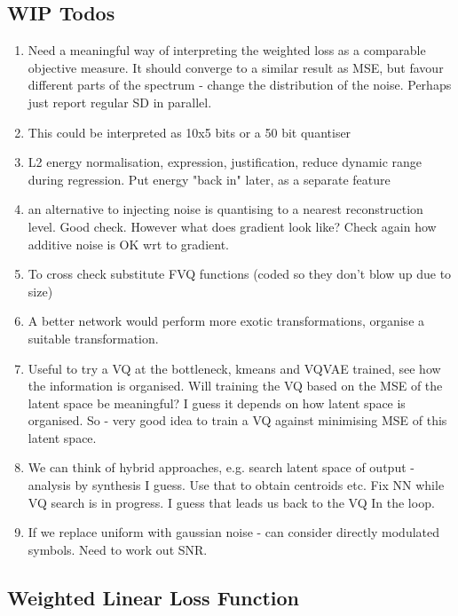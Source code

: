 \documentclass{article}
\begin{document}
\subsection {WIP Todos}

\begin{enumerate}
\item Need a meaningful way of interpreting the weighted loss as a comparable objective measure.  It should converge to a similar result as MSE, but favour different parts of the spectrum - change the distribution of the noise. Perhaps just report regular SD in parallel.
\item This could be interpreted as 10x5 bits or a 50 bit quantiser
\item L2 energy normalisation, expression, justification, reduce dynamic range during regression. Put energy "back in" later, as a separate feature
\item an alternative to injecting noise is quantising to a nearest reconstruction level.  Good check.  However what does gradient look like?  Check again how additive noise is OK wrt to gradient. 
\item To cross check substitute FVQ functions (coded so they don't blow up due to size)
\item A better network would perform more exotic transformations, organise a suitable transformation.
\item Useful to try a VQ at the bottleneck, kmeans and VQVAE trained, see how the information is organised.  Will training the VQ based on the MSE of the latent space be meaningful?  I guess it depends on how latent space is organised.  So - very good idea to train a VQ against minimising MSE of this latent space.
\item We can think of hybrid approaches, e.g. search latent space of output - analysis by synthesis I guess.  Use that to obtain centroids etc.  Fix NN while VQ search is in progress.  I guess that leads us back to the VQ In the loop.
\item If we replace uniform with gaussian noise - can consider directly modulated symbols.  Need to work out SNR.
\end{enumerate}

\subsection{Weighted Linear Loss Function}
\end{document}
